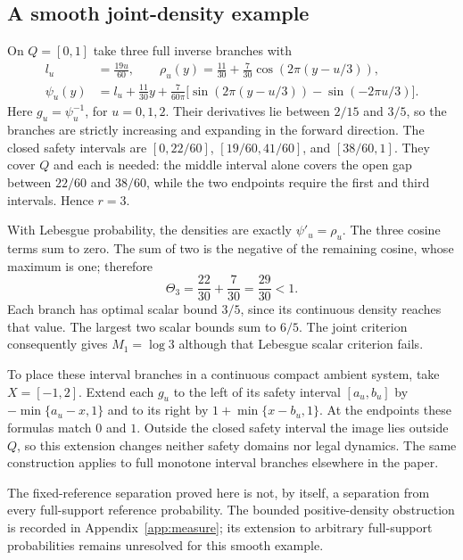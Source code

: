 \documentclass[11pt,reqno]{amsart}
\numberwithin{equation}{section}
\theoremstyle{definition}
\begin{document}
\subsection{A smooth joint-density example}\label{subsec:smooth}
On $Q=[0,1]$ take three full inverse branches with
\begin{align}
 l_u&=\frac{19u}{60},\qquad
 \rho_u(y)=\frac{11}{30}+\frac7{30}
            \cos(2\pi(y-u/3)),\label{eq:smooth-rho}\\
 \psi_u(y)&=l_u+\frac{11}{30}y+
 \frac7{60\pi}\big[\sin(2\pi(y-u/3))-\sin(-2\pi u/3)\big].
 \nonumber
\end{align}
Here $g_u=\psi_u^{-1}$, for $u=0,1,2$.
Their derivatives lie between $2/15$ and $3/5$, so the branches
are strictly increasing and expanding in the forward direction.
The closed safety intervals are
$[0,22/60]$, $[19/60,41/60]$, and $[38/60,1]$.
They cover $Q$ and each is needed: the middle interval alone covers
the open gap between $22/60$ and $38/60$, while the two endpoints
require the first and third intervals. Hence $r=3$.

With Lebesgue probability, the densities are exactly
$\psi'_u=\rho_u$. The three cosine terms sum to zero. The sum of
two is the negative of the remaining cosine, whose maximum is one;
therefore
\[
 \Theta_3=\frac{22}{30}+\frac7{30}=\frac{29}{30}<1.
\]
Each branch has optimal scalar bound $3/5$, since its continuous
density reaches that value. The largest two scalar bounds sum to
$6/5$. The joint criterion consequently gives $M_1=\log3$ although
that Lebesgue scalar criterion fails.

To place these interval branches in a continuous compact ambient
system, take $X=[-1,2]$. Extend each $g_u$ to the left of its
safety interval $[a_u,b_u]$ by $-\min\{a_u-x,1\}$ and to its
right by $1+\min\{x-b_u,1\}$. At the endpoints these formulas
match $0$ and $1$. Outside the closed safety interval the image
lies outside $Q$, so this extension changes neither safety domains
nor legal dynamics. The same construction applies to full monotone
interval branches elsewhere in the paper.

The fixed-reference separation proved here is not, by itself, a
separation from every full-support reference probability. The bounded
positive-density obstruction is recorded in
Appendix~\ref{app:measure}; its extension to arbitrary full-support
probabilities remains unresolved for this smooth example.
\end{document}
